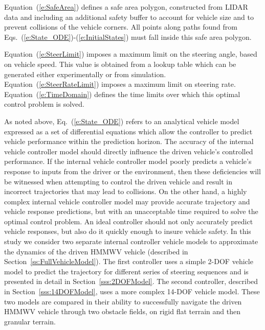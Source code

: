 \documentclass[12pt,onecolumn]{article}
\newcommand{\CHRONO}{{\sffamily{{Chrono}}}}
\begin{document}
Equation~(\ref{e:SafeArea}) defines a safe area polygon, constructed from LIDAR data and including an additional safety buffer to account for vehicle size and to prevent collisions of the vehicle corners.  All points along paths found from Eqs.~(\ref{e:State_ODE})-(\ref{e:InitialStates}) must fall inside this safe area polygon.

Equation~(\ref{e:SteerLimit}) imposes a maximum limit on the steering angle, based on vehicle speed. This value is obtained from a lookup table which can be generated either experimentally or from simulation. Equation~(\ref{e:SteerRateLimit}) imposes a maximum limit on steering rate. Equation~(\ref{e:TimeDomain}) defines the time limits over which this optimal control problem is solved.

As noted above, Eq.~(\ref{e:State_ODE}) refers to an analytical vehicle model expressed as a set of differential equations which allow the controller to predict vehicle performance within the prediction horizon. The accuracy of the internal vehicle controller model should directly influence the driven vehicle's controlled performance. If the internal vehicle controller model poorly predicts a vehicle's response to inputs from the driver or the environment, then these deficiencies will be witnessed when attempting to control the driven vehicle and result in incorrect trajectories that may lead to collisions. On the other hand, a highly complex internal vehicle controller model may provide accurate trajectory and vehicle response predictions, but with an unacceptable time required to solve the optimal control problem. An ideal controller should not only accurately predict vehicle responses, but also do it quickly enough to insure vehicle safety. 
In this study we consider two separate internal controller vehicle models to approximate the dynamics of the driven {\CHRONO} HMMWV vehicle (described in Section~\ref{ss:FullVehicleModel}).  The first controller uses a simple 2-DOF vehicle model to predict the trajectory for different series of steering sequences and is presented in detail in Section~\ref{sss:2DOFModel}. The second controller, described in Section~\ref{sss:14DOFModel}, uses a more complex 14-DOF vehicle model. These two models are compared in their ability to successfully navigate the driven HMMWV vehicle through two obstacle fields, on rigid flat terrain and then granular terrain.
\end{document}
